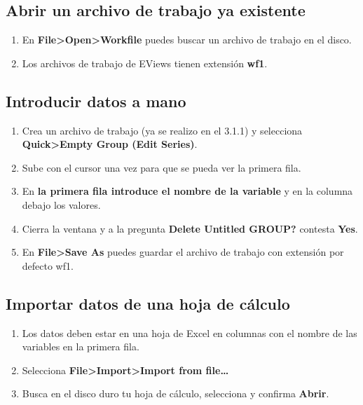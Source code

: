 \documentclass[
]{book}
\providecommand{\tightlist}{%
  \setlength{\itemsep}{0pt}\setlength{\parskip}{0pt}}
\begin{document}
\hypertarget{abrir-un-archivo-de-trabajo-ya-existente}{%
\subsection{Abrir un archivo de trabajo ya existente}\label{abrir-un-archivo-de-trabajo-ya-existente}}

\begin{enumerate}
\def\labelenumi{\arabic{enumi}.}
\tightlist
\item
  En \textbf{File\textgreater Open\textgreater Workfile} puedes buscar un archivo de trabajo en el disco.
\item
  Los archivos de trabajo de EViews tienen extensión \textbf{wf1}.
\end{enumerate}

\hypertarget{introducir-datos-a-mano}{%
\subsection{Introducir datos a mano}\label{introducir-datos-a-mano}}

\begin{enumerate}
\def\labelenumi{\arabic{enumi}.}
\tightlist
\item
  Crea un archivo de trabajo (ya se realizo en el 3.1.1) y selecciona \textbf{Quick\textgreater Empty Group (Edit Series)}.
\item
  Sube con el cursor una vez para que se pueda ver la primera fila.
\item
  En \textbf{la primera fila introduce el nombre de la variable} y en la columna debajo los valores.
\item
  Cierra la ventana y a la pregunta \textbf{Delete Untitled GROUP?} contesta \textbf{Yes}.
\item
  En \textbf{File\textgreater Save As} puedes guardar el archivo de trabajo con extensión por defecto wf1.
\end{enumerate}

\hypertarget{importar-datos-de-una-hoja-de-cuxe1lculo}{%
\subsection{Importar datos de una hoja de cálculo}\label{importar-datos-de-una-hoja-de-cuxe1lculo}}

\begin{enumerate}
\def\labelenumi{\arabic{enumi}.}
\tightlist
\item
  Los datos deben estar en una hoja de Excel en columnas con el nombre de las variables en la primera fila.
\item
  Selecciona \textbf{File\textgreater Import\textgreater Import from file\ldots{}}
\item
  Busca en el disco duro tu hoja de cálculo, selecciona y confirma \textbf{Abrir}.
\end{enumerate}
\end{document}
